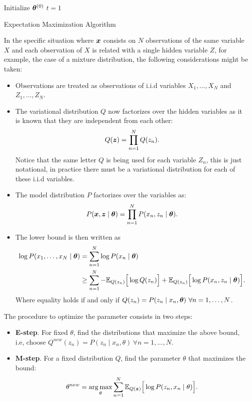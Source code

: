  \begin{algorithm}[t]
  \SetAlgoLined{}
  Initialize \(\bm{\theta}^{(0)}\)\;
  \(t=1\)\;
  \KwRet{\(\theta\)}\;
  \caption{Expectation Maximization Algorithm}\label{alg:em}
\end{algorithm}

In the specific situation where \(\bm{x}\) consists on \(N\) observations of the same variable \(X\) and each observation of \(X\) is related with a single hidden variable \(Z\), for example, the case of a mixture distribution, the following considerations might be taken:
\begin{itemize}\setlength{\itemsep}{0.2cm}
  \item Observations are treated as observations of i.i.d variables \(X_{1},\dots, X_{N}\) and \(Z_{1},\dots,Z_{N}\).
  \item The variational distribution \(Q\) now factorizes over the hidden variables as it is known that they are independent from each other:
    \[
    Q(\bm{z}) = \prod_{n=1}^{N}Q(z_{n}).
    \]
    Notice that the same letter \(Q\) is being used for each variable \(Z_{n}\), this is just notational, in practice there must be a variational distribution for each of these i.i.d variables.
  \item The model distribution \(P\) factorizes over the variables as:
    \[
    P(\bm{x}, \bm{z} \mid \bm{\theta}) = \prod_{n=1}^{N}P(x_{n}, z_{n} \mid \bm{\theta}).
    \]
  \item The lower bound is then written as
    \[
    \begin{aligned}
      \log{P(x_{1},\dots,x_{N} \mid \bm{\theta})} &= \sum_{n=1}^{N}\log{P(x_{n} \mid \bm{\theta})}\\
      &\geq \sum_{n = 1}^{N} -\mathbb{E}_{Q(z_{n})}\Big[\log{Q(z_{n})}\Big] + \mathbb{E}_{Q(z_{n})}\Big[\log{P(x_{n},z_{n} \mid \bm{\theta})}\Big].
    \end{aligned}
    \]
    Where equality holds if and only if \(Q(z_{n}) = P(z_{n} \mid x_{n} , \bm{\theta}) \ \forall n=1, \dots, N\).
\end{itemize}

The procedure to optimize the parameter consists in two steps:
\begin{itemize}\setlength{\itemsep}{0.2cm}
  \item \textbf{E-step}. For fixed \(\theta\), find the distributions that maximize the above bound, i.e, choose \(Q^{new}(z_{n}) = P(z_{n} \mid x_{n} , \theta) \ \forall n = 1,\dots,N\).
  \item \textbf{M-step}. For a fixed distribution \(Q\), find the parameter \(\theta\) that maximizes the bound:
    \[
    \theta^{new} = \operatorname*{arg\,max}_{\theta}\sum_{n=1}^{N}\mathbb{E}_{Q(\bm{z})}\Big[\log{P(z_{n}, x_{n} \mid \theta)}\Big].
    \]
\end{itemize}

